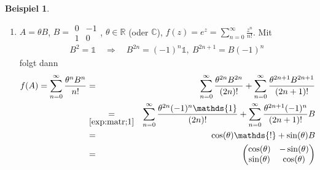 \documentclass[11pt,titlepage]{article}
\theoremstyle{definition}
\newtheorem{example}[theorem]{Beispiel}
\theoremstyle{remark}
\begin{document}
	\begin{example}
		\begin{enumerate}
			\item $A=\theta B$, $B=\begin{smallmatrix} 0&-1\\ 1&0\end{smallmatrix}$, $\theta\in\mathbb{R}$ 
			(oder $\mathbb{C}$), $f(z)=e^z =\sum_{n=0}^{\infty} \frac{z^n}{n!}$. Mit
			\begin{eqnarray}
				B^2=\mathds{1} \quad\Rightarrow\quad B^{2n}=(-1)^n\mathds{1},\ B^{2n+1}=B(-1)^n 
				\label{exp:matr;1}
			\end{eqnarray}
			folgt dann
			\begin{eqnarray*}
				f(A)=\sum_{n=0}^{\infty} \frac{\theta^n B^n}{n!} 
				&=&\sum_{n=0}^{\infty} \frac{\theta^{2n}B^{2n}}{(2n)!}+\sum_{n=0}^{\infty}
				\frac{\theta^{2n+1}B^{2n+1}}{(2n+1)!} \\
				&\underset{\ref{exp:matr;1}}{=}&  \sum_{n=0}^{\infty} \frac{\theta^{2n}(-1)^n\mathds{1}}
				{(2n)!}+\sum_{n=0}^{\infty} \frac{\theta^{2n+1}(-1)^n}{(2n+1)!}B \\
				&=& \cos(\theta)\mathds{!} +\sin(\theta)B \\
				&=& \begin{pmatrix} \cos(\theta) & -\sin(\theta) \\ \sin(\theta) & \cos(\theta) \end{pmatrix}
			\end{eqnarray*}
			

\end{enumerate}
\end{example}
\end{document}
